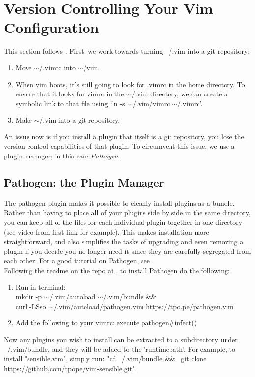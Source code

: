 \documentclass[10pt]{article}
\newcommand{\tsim}{$\sim$}
\begin{document}
\section{Version Controlling Your Vim Configuration}
This section follows \cite{neil2010synchronizing}. First, we work towards turning ~/.vim into a git repository: 
\begin{enumerate}
    \item Move \tsim/.vimrc into \tsim/vim.
    \item When vim boots, it's still going to look for .vimrc in the home directory. To ensure that it looks for vimrc
        in the \tsim/.vim directory, we can create a symbolic link to that file using `ln -s \tsim/.vim/vimrc
        \tsim/.vimrc'.  \item Make \tsim/.vim into a git repository.
\end{enumerate}
An issue now is if you install a plugin that itself is a git repository, you lose the version-control capabilities of
that plugin. To circumvent this issue, we use a plugin manager; in this case \textit{Pathogen}.\\

\subsection{Pathogen: the Plugin Manager} \label{SecPathogen}
The pathogen plugin makes it possible to cleanly install plugins as a bundle. Rather than having to place all of your
plugins side by side in the same directory, you can keep all of the files for each individual plugin together in one
directory (see video from first link for example). This makes installation more straightforward, and also simplifies
the tasks of upgrading and even removing a plugin if you decide you no longer need it since they are carefully
segregated from each other. For a good tutorial on Pathogen, see \cite{lafourcade2014how}.\\
 
Following the readme on the repo at \cite{pope2009pathogen}, to install Pathogen do the following:
\begin{enumerate}
    \item Run in terminal:\\
        mkdir -p \tsim/.vim/autoload \tsim/.vim/bundle \&\& \ \\
        curl -LSso \tsim/.vim/autoload/pathogen.vim https://tpo.pe/pathogen.vim
    \item Add the following to your vimrc:
        execute pathogen\#infect()
\end{enumerate}
Now any plugins you wish to install can be extracted to a subdirectory under ~/.vim/bundle, and they will be added to
the 'runtimepath'. For example, to install "sensible.vim", simply run: "cd ~/.vim/bundle \&\& \ git clone
https://github.com/tpope/vim-sensible.git".
\end{document}
